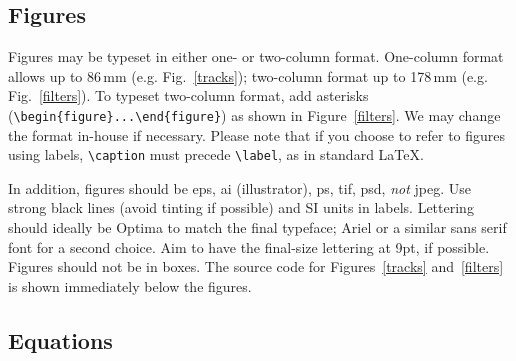 \documentclass[twocolumn]{igs}
\begin{document}
\subsection{Figures}

Figures may be typeset in either one- or two-column format. One-column format allows up to 86$\,$mm (e.g. Fig.~\ref{tracks}); two-column format up to 178$\,$mm (e.g. Fig.~\ref{filters}). To typeset two-column format, add asterisks (\verb"\begin{figure}...\end{figure}") as shown in Figure~\ref{filters}. We may change the format in-house if necessary. Please note that if you choose to refer to figures using labels, \verb"\caption" must precede \verb"\label", as in standard \LaTeX.

In addition, figures should be eps, ai (illustrator), ps, tif, psd, \emph{not} jpeg. Use strong black lines (avoid tinting if possible) and SI units in labels. Lettering should ideally be Optima to match the final typeface; Ariel or a similar sans serif font for a second choice. Aim to have the final-size lettering at 9pt, if possible. Figures should not be in boxes. The source code for Figures~\ref{tracks} and~\ref{filters} is shown immediately below the figures.


\subsection{Equations}
\end{document}
